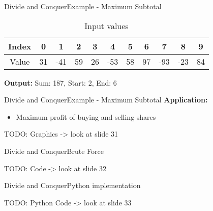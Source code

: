 \begin{frame}{Divide and Conquer}{Example - Maximum Subtotal}
  \begin{example}
    \vspace{-1em}
    \begin{table}[!t]
      \caption{Input values}
      \begin{tabular}{c|c|c|c|c|c|c|c|c|c|c}
        Index & 0 & 1 & 2 & 3 & 4 & 5 & 6 & 7 & 8 & 9\\
        \midrule
        Value & 31 & -41 & 59 & 26 & -53 & 58 & 97 & -93 & -23 & 84
      \end{tabular}
      \label{tab:divide_and_conquer:max_subtotal_example_values}
    \end{table}
    \vspace{6em}
    \textbf{Output:} Sum: 187, Start: 2, End: 6
  \end{example}
\end{frame}


\begin{frame}{Divide and Conquer}{Example - Maximum Subtotal}
  \textbf{Application:}
  \begin{itemize}
    \item
      Maximum profit of buying and selling shares
  \end{itemize}
  
  TODO: Graphics -> look at slide 31 \vspace{2em}
  
\end{frame}


\begin{frame}{Divide and Conquer}{Brute Force}
  
  TODO: Code -> look at slide 32 \vspace{2em}
  
\end{frame}


\begin{frame}{Divide and Conquer}{Python implementation}
  
  TODO: Python Code -> look at slide 33 \vspace{2em}
  
\end{frame}


